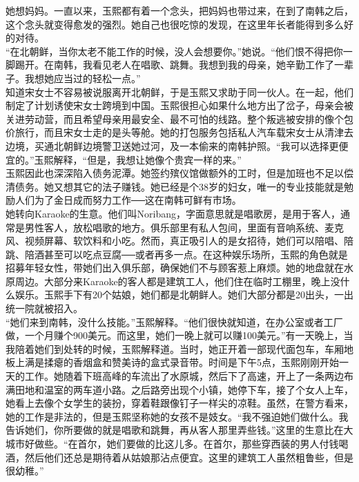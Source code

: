 她想妈妈。一直以来，玉熙都有着一个念头，把妈妈也带过来，在到了南韩之后，这个念头就变得愈发的强烈。她自己也很吃惊的发现，在这里年长者能得到多么好的对待。\\

“在北朝鲜，当你太老不能工作的时候，没人会想要你。”她说。“他们恨不得把你一脚踢开。在南韩，我看见老人在唱歌、跳舞。我想到我的母亲，她辛勤工作了一辈子。我想她应当过的轻松一点。”\\

知道宋女士不容易被说服离开北朝鲜，于是玉熙又求助于同一伙人。在一起，他们制定了计划诱使宋女士跨境到中国。玉熙很担心如果什么地方出了岔子，母亲会被关进劳动营，而且希望母亲用最安全、最不可怕的线路。整个叛逃被安排的像个包价旅行，而且宋女士走的是头等舱。她的打包服务包括私人汽车载宋女士从清津去边境，买通北朝鲜边境警卫送她过河，及一本偷来的南韩护照。“我可以选择更便宜的。”玉熙解释，“但是，我想让她像个贵宾一样的来。”\\

玉熙因此也深深陷入债务泥潭。她签约殡仪馆做额外的工时，但是加班也不足以偿清债务。她又想其它的法子赚钱。她已经是个38岁的妇女，唯一的专业技能就是勉励人们为了金日成而努力工作──这在南韩可鲜有市场。\\

她转向Karaoke的生意。他们叫Noribang，字面意思就是唱歌房，是用于客人，通常是男性客人，放松唱歌的地方。俱乐部里有私人包间，里面有音响系统、麦克风、视频屏幕、软饮料和小吃。然而，真正吸引人的是女招待，她们可以陪唱、陪跳、陪酒甚至可以吃点豆腐──或者再多一点。在这种娱乐场所，玉熙的角色就是招募年轻女性，带她们出入俱乐部，确保她们不与顾客惹上麻烦。她的地盘就在水原周边。大部分来Karaoke的客人都是建筑工人，他们住在临时工棚里，晚上没什么娱乐。玉熙手下有20个姑娘，她们都是北朝鲜人。她们大部分都是20出头，一出统一院就被招入。\\

“她们来到南韩，没什么技能。”玉熙解释。“他们很快就知道，在办公室或者工厂做，一个月赚个900美元。而这里，她们一晚上就可以赚100美元。”有一天晚上，当我陪着她们到处转的时候，玉熙解释道。当时，她正开着一部现代面包车，车厢地板上满是揉瘪的香烟盒和赞美诗的盒式录音带。时间是下午5点，玉熙刚刚开始一天的工作。她随着下班高峰的车流出了水原城，然后下了高速，开上了一条两边布满田地和温室的两车道小路。之后路旁出现个小镇，她停下车，接了个女人上车，她看上去像个女学生的装扮，穿着鞋跟像钉子一样尖的凉鞋。虽然，在警方看来，她的工作是非法的，但是玉熙坚称她的女孩不是妓女。“我不强迫她们做什么。我告诉她们，你所要做的就是唱歌和跳舞，再从客人那里弄些钱。”这里的生意比在大城市好做些。“在首尔，她们要做的比这儿多。在首尔，那些穿西装的男人付钱喝酒，然后他们还总是期待着从姑娘那沾点便宜。这里的建筑工人虽然粗鲁些，但是很幼稚。”\\

